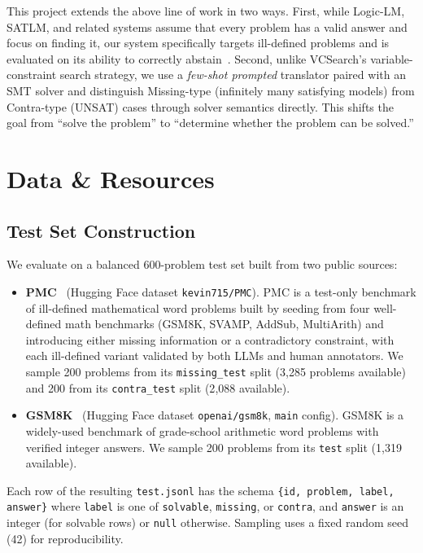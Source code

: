 \documentclass[sigconf, nonacm, onecolumn]{acmart}
\begin{document}
This project extends the above line of work in two ways. First, while
Logic-LM, SATLM, and related systems assume that every problem has a valid
answer and focus on finding it, our system specifically targets ill-defined
problems and is evaluated on its ability to correctly
abstain~\cite{puchalska1987,zhou2024}. Second, unlike VCSearch's
variable-constraint search strategy, we use a \emph{few-shot prompted}
translator paired with an SMT solver and distinguish Missing-type
(infinitely many satisfying models) from Contra-type (UNSAT) cases through
solver semantics directly. This shifts the goal from ``solve the problem''
to ``determine whether the problem can be solved.''

\section{Data \& Resources}

\subsection{Test Set Construction}

We evaluate on a balanced 600-problem test set built from two public
sources:

\begin{itemize}
  \item \textbf{PMC}~\cite{zhou2024} (Hugging Face dataset
  \texttt{kevin715/PMC}). PMC is a test-only benchmark of ill-defined
  mathematical word problems built by seeding from four well-defined math
  benchmarks (GSM8K, SVAMP, AddSub, MultiArith) and introducing either
  missing information or a contradictory constraint, with each ill-defined
  variant validated by both LLMs and human annotators. We sample 200
  problems from its \texttt{missing\_test} split (3{,}285 problems
  available) and 200 from its \texttt{contra\_test} split (2{,}088
  available).
  \item \textbf{GSM8K}~\cite{cobbe2021} (Hugging Face dataset
  \texttt{openai/gsm8k}, \texttt{main} config). GSM8K is a widely-used
  benchmark of grade-school arithmetic word problems with verified integer
  answers. We sample 200 problems from its \texttt{test} split (1{,}319
  available).
\end{itemize}

Each row of the resulting \texttt{test.jsonl} has the schema
\texttt{\{id, problem, label, answer\}} where \texttt{label} is one of
\texttt{solvable}, \texttt{missing}, or \texttt{contra}, and
\texttt{answer} is an integer (for solvable rows) or \texttt{null}
otherwise. Sampling uses a fixed random seed (42) for reproducibility.
\end{document}
